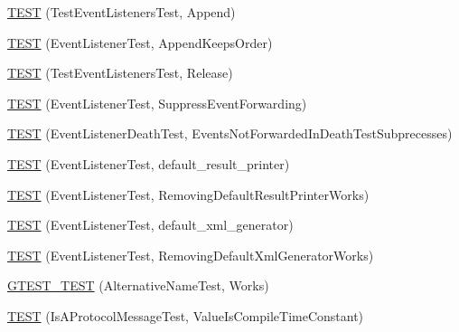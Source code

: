 \begin{DoxyCompactItemize}
\mbox{\hyperlink{_obj__test_2lib_2googletest-release-1_88_81_2googletest_2test_2gtest__unittest_8cc_a4b3f65b804787ed25c4136df142e1f77}{T\+E\+ST}} (Test\+Event\+Listeners\+Test, Append)
\item 
\mbox{\hyperlink{_obj__test_2lib_2googletest-release-1_88_81_2googletest_2test_2gtest__unittest_8cc_a2a1ece611968f69f9feb86f639089511}{T\+E\+ST}} (Event\+Listener\+Test, Append\+Keeps\+Order)
\item 
\mbox{\hyperlink{_obj__test_2lib_2googletest-release-1_88_81_2googletest_2test_2gtest__unittest_8cc_aefe7d8b3422fb27b9c7281c0434881be}{T\+E\+ST}} (Test\+Event\+Listeners\+Test, Release)
\item 
\mbox{\hyperlink{_obj__test_2lib_2googletest-release-1_88_81_2googletest_2test_2gtest__unittest_8cc_abdd2f070281db35988b7f6c22f2623e7}{T\+E\+ST}} (Event\+Listener\+Test, Suppress\+Event\+Forwarding)
\item 
\mbox{\hyperlink{_obj__test_2lib_2googletest-release-1_88_81_2googletest_2test_2gtest__unittest_8cc_a3e3bfce9c199215053e43d9d1a248af8}{T\+E\+ST}} (Event\+Listener\+Death\+Test, Events\+Not\+Forwarded\+In\+Death\+Test\+Subprecesses)
\item 
\mbox{\hyperlink{_obj__test_2lib_2googletest-release-1_88_81_2googletest_2test_2gtest__unittest_8cc_a6fa482480599861df0c182c4d4229133}{T\+E\+ST}} (Event\+Listener\+Test, default\+\_\+result\+\_\+printer)
\item 
\mbox{\hyperlink{_obj__test_2lib_2googletest-release-1_88_81_2googletest_2test_2gtest__unittest_8cc_a32187fe0e1d4620d0ed5a7c6cc7254b8}{T\+E\+ST}} (Event\+Listener\+Test, Removing\+Default\+Result\+Printer\+Works)
\item 
\mbox{\hyperlink{_obj__test_2lib_2googletest-release-1_88_81_2googletest_2test_2gtest__unittest_8cc_aff2c25cbedbe72d8bb0162bc1bd0fece}{T\+E\+ST}} (Event\+Listener\+Test, default\+\_\+xml\+\_\+generator)
\item 
\mbox{\hyperlink{_obj__test_2lib_2googletest-release-1_88_81_2googletest_2test_2gtest__unittest_8cc_a77647d09c995f09d06e2f02b13277c44}{T\+E\+ST}} (Event\+Listener\+Test, Removing\+Default\+Xml\+Generator\+Works)
\item 
\mbox{\hyperlink{_obj__test_2lib_2googletest-release-1_88_81_2googletest_2test_2gtest__unittest_8cc_a54247aeadc0617105812dca8609638de}{G\+T\+E\+S\+T\+\_\+\+T\+E\+ST}} (Alternative\+Name\+Test, Works)
\item 
\mbox{\hyperlink{_obj__test_2lib_2googletest-release-1_88_81_2googletest_2test_2gtest__unittest_8cc_a92eccf2c14f70b39d88564370690b303}{T\+E\+ST}} (Is\+A\+Protocol\+Message\+Test, Value\+Is\+Compile\+Time\+Constant)

\end{DoxyCompactItemize}
